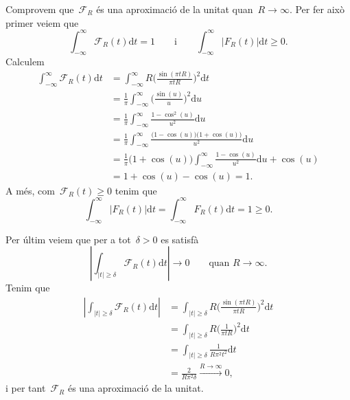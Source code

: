 \documentclass[a4paper]{article}
\theoremstyle{definition}
\newcommand{\uppi}{\pi}
\newcommand{\diff}{\mathrm{d}}
\newcommand{\abs}[1]{\lvert{#1}\rvert}
\newcommand{\Abs}[1]{\left\lvert{#1}\right\rvert}
\newcommand{\F}{\mathcal{F}}
\begin{document}
Comprovem que~\(\F_{R}\) és una aproximació de la unitat quan~\(R\to\infty\).
Per fer això primer veiem que
\[
    \int_{-\infty}^{\infty} \F_{R}(t) \diff t = 1
    \qquad\text{i}\qquad
    \int_{-\infty}^{\infty} \abs{F_{R}(t)} \diff t \geq 0.
\]
Calculem
\begin{align*}
    \int_{-\infty}^{\infty} \F_{R}(t)\diff t
        &= \int_{-\infty}^{\infty}
           R\biggl(\frac{\sin(\uppi tR)}{\uppi tR}\biggr)^{2}
           \diff t \\
        &= \frac{1}{\uppi}
           \int_{-\infty}^{\infty}
           \biggl(\frac{\sin(u)}{u}\biggr)^{2}
           \diff u \\
        &= \frac{1}{\uppi}
           \int_{-\infty}^{\infty}
           \frac{1-\cos^{2}(u)}{u^{2}}
           \diff u \\
        &= \frac{1}{\uppi}
           \int_{-\infty}^{\infty}
           \frac{\bigl(1-\cos(u)\bigr)\bigl(1+\cos(u)\bigr)}{u^{2}}
           \diff u \\
        &= \frac{1}{\uppi}
           \bigl(1+\cos(u)\bigr)
           \int_{-\infty}^{\infty}
           \frac{1-\cos(u)}{u^{2}}
           \diff u
           +
           \cos(u) \\
        &= 1 + \cos(u) - \cos(u) = 1.
\end{align*}
A més, com~\(\F_{R}(t) \geq 0\) tenim que
\[
    \int_{-\infty}^{\infty} \abs{F_{R}(t)} \diff t
    = \int_{-\infty}^{\infty} F_{R}(t) \diff t
    = 1 \geq 0.
\]

Per últim veiem que per a tot~\(\delta > 0\) es satisfà
\[
    \Abs{\int_{\abs{t}\geq\delta} \F_{R}(t)\diff t} \to 0
    \qquad
    \text{quan }
    R \to \infty.
\]
Tenim que
\begin{align*}
    \Abs{\int_{\abs{t}\geq\delta} \F_{R}(t) \diff t}
        &= \int_{\abs{t}\geq\delta}
           R\biggl(\frac{\sin(\uppi tR)}{\uppi tR}\biggr)^{2}
           \diff t \\
        &= \int_{\abs{t}\geq\delta}
           R\biggl(\frac{1}{\uppi tR}\biggr)^{2}
           \diff t \\
        &= \int_{\abs{t}\geq\delta}
           \frac{1}{R\uppi^{2}t^{2}}
           \diff t \\
        &= \frac{2}{R\uppi^{2}\delta} \xrightarrow{R\to\infty} 0,
\end{align*}
i per tant~\(\F_{R}\) és una aproximació de la unitat.
\end{document}
